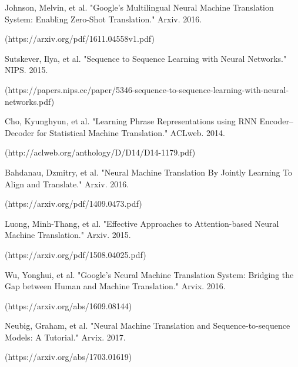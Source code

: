\documentclass[10pt,a4paper]{article}
\begin{document}
Johnson, Melvin, et al. "Google’s Multilingual Neural Machine Translation System: Enabling Zero-Shot Translation." Arxiv. 2016.

(https://arxiv.org/pdf/1611.04558v1.pdf)
\newline

Sutskever, Ilya, et al. "Sequence to Sequence Learning with Neural Networks." NIPS. 2015.

(https://papers.nips.cc/paper/5346-sequence-to-sequence-learning-with-neural-networks.pdf)
\newline

Cho, Kyunghyun, et al. "Learning Phrase Representations using RNN Encoder–Decoder for Statistical Machine Translation." ACLweb. 2014.

(http://aclweb.org/anthology/D/D14/D14-1179.pdf)
\newline

Bahdanau, Dzmitry, et al. "Neural Machine Translation By Jointly Learning To Align and Translate." Arxiv. 2016.

(https://arxiv.org/pdf/1409.0473.pdf)
\newline

Luong, Minh-Thang, et al. "Effective Approaches to Attention-based Neural Machine Translation." Arxiv. 2015.

(https://arxiv.org/pdf/1508.04025.pdf)
\newline

Wu, Yonghui, et al. "Google’s Neural Machine Translation System: Bridging the Gap between Human and Machine Translation." Arvix. 2016.

(https://arxiv.org/abs/1609.08144)
\newline

Neubig, Graham, et al. "Neural Machine Translation and Sequence-to-sequence Models: A Tutorial." Arvix. 2017.

(https://arxiv.org/abs/1703.01619)
\newline
\end{document}
